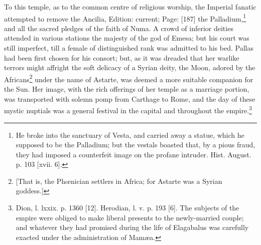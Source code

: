 To this temple, as to the common centre of religious worship, the Imperial fanatic attempted to remove the Ancilia, Edition: current; Page: [187] the Palladium,\footnote{He broke into the sanctuary of Vesta, and carried away a statue, which he supposed to be the Palladium; but the vestals boasted that, by a pious fraud, they had imposed a counterfeit image on the profane intruder. Hist. August. p. 103 [xvii. 6].} and all the sacred pledges of the faith of Numa. A crowd of inferior deities attended in various stations the majesty of the god of Emesa; but his court was still imperfect, till a female of distinguished rank was admitted to his bed. Pallas had been first chosen for his consort; but, as it was dreaded that her warlike terrors might affright the soft delicacy of a Syrian deity, the Moon, adored by the Africans\footnote{[That is, the Phœnician settlers in Africa; for Astarte was a Syrian goddess.]} under the name of Astarte, was deemed a more suitable companion for the Sun. Her image, with the rich offerings of her temple as a marriage portion, was transported with solemn pomp from Carthage to Rome, and the day of these mystic nuptials was a general festival in the capital and throughout the empire.\footnote{Dion, l. lxxix. p. 1360 [12]. Herodian, l. v. p. 193 [6]. The subjects of the empire were obliged to make liberal presents to the newly-married couple; and whatever they had promised during the life of Elagabalus was carefully exacted under the administration of Mamæa.}

